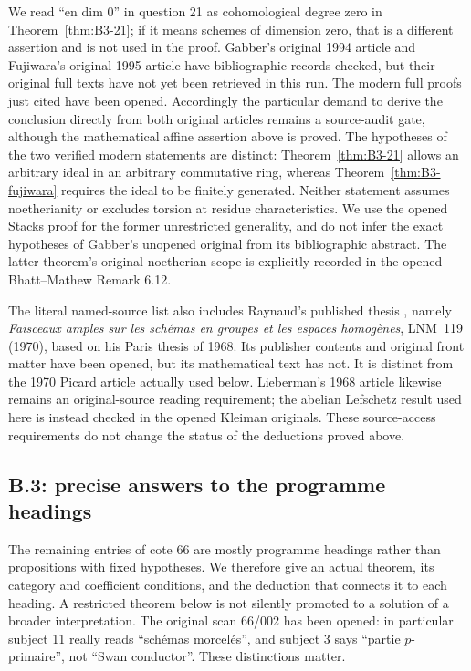 We read ``en dim 0'' in question 21 as cohomological degree zero in
Theorem~\ref{thm:B3-21}; if it means schemes of dimension zero, that is a
different assertion and is not used in the proof. Gabber's original
1994 article and Fujiwara's original 1995 article have bibliographic
records checked, but their original full texts have not yet been
retrieved in this run. The modern full proofs just cited have been
opened. Accordingly the particular demand to derive the conclusion
directly from both original articles remains a source-audit gate,
although the mathematical affine assertion above is proved.
The hypotheses of the two verified modern statements are distinct:
Theorem~\ref{thm:B3-21} allows an arbitrary ideal in an arbitrary
commutative ring, whereas Theorem~\ref{thm:B3-fujiwara} requires the
ideal to be finitely generated. Neither statement assumes
noetherianity or excludes torsion at residue characteristics.
We use the opened Stacks proof for the former unrestricted
generality, and do not infer the exact hypotheses of Gabber's
unopened original from its bibliographic abstract. The latter
theorem's original noetherian scope is explicitly recorded in the
opened Bhatt--Mathew Remark 6.12.

The literal named-source list also includes Raynaud's published thesis
\cite{BRaynaudThesis1970}, namely \emph{Faisceaux amples sur les
sch\'emas en groupes et les espaces homog\`enes}, LNM~119 (1970),
based on his Paris thesis of 1968. Its publisher contents and original
front matter have been opened, but its mathematical text has not.
It is distinct from the 1970 Picard article actually used below.
Lieberman's 1968 article likewise remains an original-source reading
requirement; the abelian Lefschetz result used here is instead checked
in the opened Kleiman originals. These source-access requirements do
not change the status of the deductions proved above.

\subsection{B.3: precise answers to the programme headings}

The remaining entries of cote 66 are mostly programme headings rather
than propositions with fixed hypotheses. We therefore give an actual
theorem, its category and coefficient conditions, and the deduction
that connects it to each heading. A restricted theorem below is not
silently promoted to a solution of a broader interpretation. The
original scan 66/002 has been opened: in particular subject 11 really
reads ``sch\'emas morcel\'es'', and subject 3 says ``partie
$p$-primaire'', not ``Swan conductor''. These distinctions matter.

